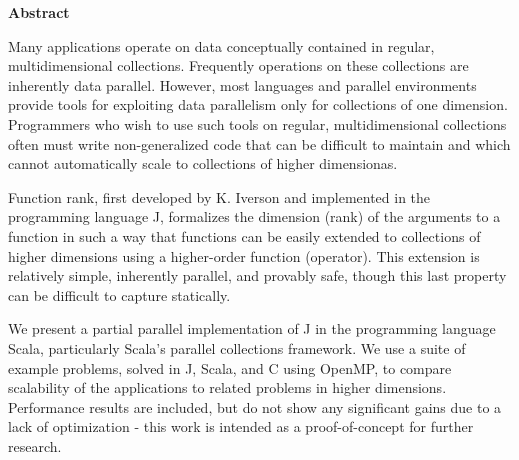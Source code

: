 \begin{center}

\bigskip

\begin{Large}
\textbf{\theTitle}
\end{Large}

\bigskip

\begin{large}
\theAuthor
\end{large}

\bigskip
\bigskip

\textbf{Abstract}

\end{center}

\noindent
Many applications operate on data conceptually contained in regular, multidimensional collections.
Frequently operations on these collections are inherently data parallel.
However, most languages and parallel environments provide tools for exploiting data parallelism only for collections of one dimension.
Programmers who wish to use such tools on regular, multidimensional collections often must write non-generalized code that can be difficult to maintain and which cannot automatically scale to collections of higher dimensionas.

Function rank, first developed by K. Iverson and implemented in the programming language J, formalizes the dimension (rank) of the arguments to a function in such a way that functions can be easily extended to collections of higher dimensions using a higher-order function (operator).
This extension is relatively simple, inherently parallel, and provably safe, though this last property can be difficult to capture statically.

We present a partial parallel implementation of J in the programming language Scala, particularly Scala's parallel collections framework.
We use a suite of example problems, solved in J, Scala, and C using OpenMP, to compare scalability of the applications to related problems in higher dimensions.
Performance results are included, but do not show any significant gains due to a lack of optimization - this work is intended as a proof-of-concept for further research.
